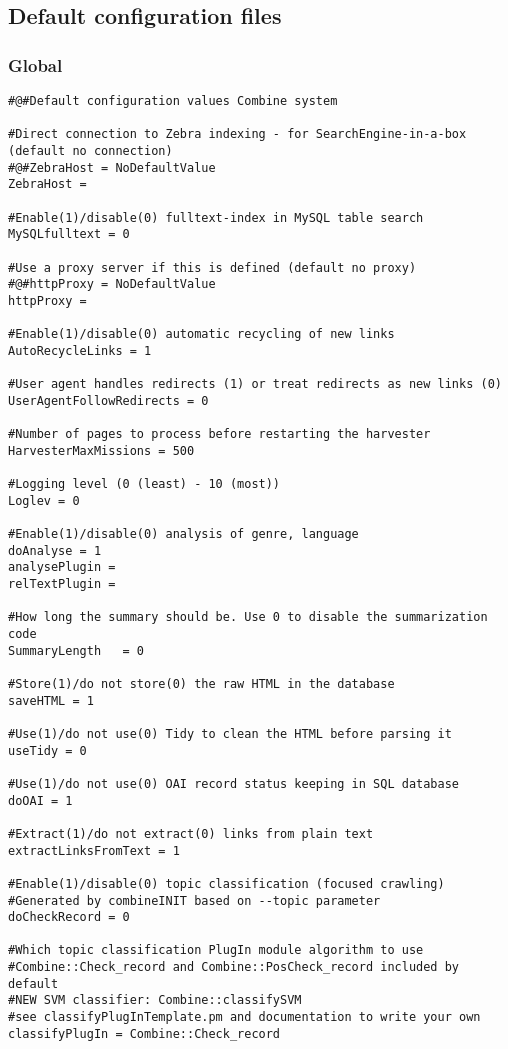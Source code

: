 \subsection{Default configuration files}

\label{conffiles}
\subsubsection{Global}

\begin{verbatim}
#@#Default configuration values Combine system

#Direct connection to Zebra indexing - for SearchEngine-in-a-box (default no connection)
#@#ZebraHost = NoDefaultValue
ZebraHost =

#Enable(1)/disable(0) fulltext-index in MySQL table search
MySQLfulltext = 0

#Use a proxy server if this is defined (default no proxy)
#@#httpProxy = NoDefaultValue
httpProxy =

#Enable(1)/disable(0) automatic recycling of new links
AutoRecycleLinks = 1

#User agent handles redirects (1) or treat redirects as new links (0)
UserAgentFollowRedirects = 0

#Number of pages to process before restarting the harvester
HarvesterMaxMissions = 500

#Logging level (0 (least) - 10 (most))
Loglev = 0

#Enable(1)/disable(0) analysis of genre, language
doAnalyse = 1
analysePlugin =
relTextPlugin =

#How long the summary should be. Use 0 to disable the summarization code
SummaryLength   = 0

#Store(1)/do not store(0) the raw HTML in the database
saveHTML = 1

#Use(1)/do not use(0) Tidy to clean the HTML before parsing it
useTidy = 0

#Use(1)/do not use(0) OAI record status keeping in SQL database
doOAI = 1

#Extract(1)/do not extract(0) links from plain text
extractLinksFromText = 1

#Enable(1)/disable(0) topic classification (focused crawling)
#Generated by combineINIT based on --topic parameter
doCheckRecord = 0

#Which topic classification PlugIn module algorithm to use
#Combine::Check_record and Combine::PosCheck_record included by default
#NEW SVM classifier: Combine::classifySVM
#see classifyPlugInTemplate.pm and documentation to write your own
classifyPlugIn = Combine::Check_record


\end{verbatim}
